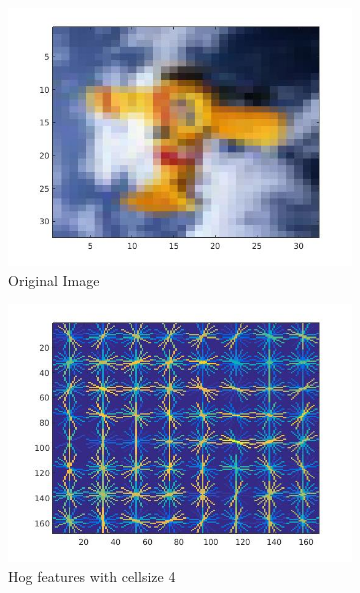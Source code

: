 \documentclass{article} %
\begin{document}
\begin{figure}
\begin{subfigure}{0.33\textwidth}
\centering
\includegraphics[scale=0.3]{images/hog_original}
\caption{Original Image}
\end{subfigure}
\begin{subfigure}{0.33\textwidth}
\centering
\includegraphics[scale=0.3]{images/hog_cellsize_4}
\caption{Hog features with cellsize 4}
\end{subfigure}
\begin{subfigure}{0.33\textwidth}
\centering

\end{subfigure}
\end{figure}
\end{document}
